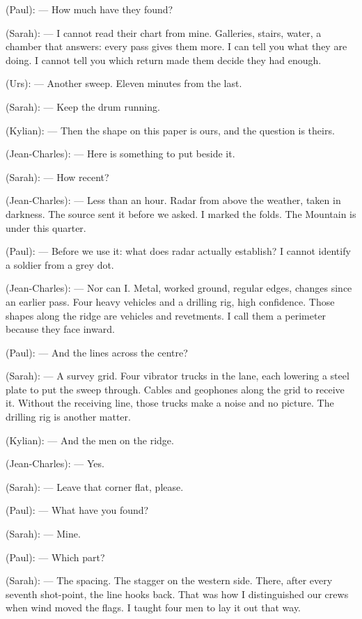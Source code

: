 \begin{room}
(Paul): --- How much have they found?

(Sarah): --- I cannot read their chart from mine. Galleries, stairs, water, a chamber that answers: every pass gives them more. I can tell you what they are doing. I cannot tell you which return made them decide they had enough.

(Urs): --- Another sweep. Eleven minutes from the last.

(Sarah): --- Keep the drum running.

(Kylian): --- Then the shape on this paper is ours, and the question is theirs.

(Jean-Charles): --- Here is something to put beside it.

(Sarah): --- How recent?

(Jean-Charles): --- Less than an hour. Radar from above the weather, taken in darkness. The source sent it before we asked. I marked the folds. The Mountain is under this quarter.

(Paul): --- Before we use it: what does radar actually establish? I cannot identify a soldier from a grey dot.

(Jean-Charles): --- Nor can I. Metal, worked ground, regular edges, changes since an earlier pass. Four heavy vehicles and a drilling rig, high confidence. Those shapes along the ridge are vehicles and revetments. I call them a perimeter because they face inward.

(Paul): --- And the lines across the centre?

(Sarah): --- A survey grid. Four vibrator trucks in the lane, each lowering a steel plate to put the sweep through. Cables and geophones along the grid to receive it. Without the receiving line, those trucks make a noise and no picture. The drilling rig is another matter.

(Kylian): --- And the men on the ridge.

(Jean-Charles): --- Yes.

(Sarah): --- Leave that corner flat, please.

(Paul): --- What have you found?

(Sarah): --- Mine.

\centerline{}

(Paul): --- Which part?

(Sarah): --- The spacing. The stagger on the western side. There, after every seventh shot-point, the line hooks back. That was how I distinguished our crews when wind moved the flags. I taught four men to lay it out that way.


\end{room}
